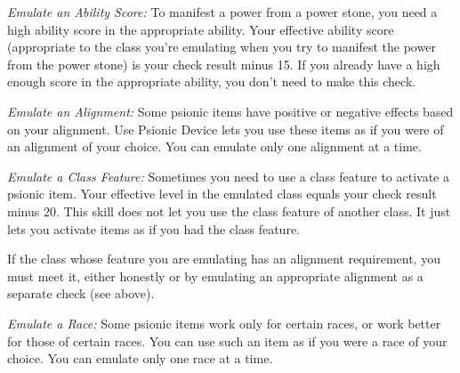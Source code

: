 
\textit{Emulate an Ability Score:} To manifest a power from a power stone, you need a high ability score in the appropriate ability. Your effective ability score (appropriate to the class you're emulating when you try to manifest the power from the power stone) is your check result minus 15. If you already have a high enough score in the appropriate ability, you don't need to make this check.

\textit{Emulate an Alignment:} Some psionic items have positive or negative effects based on your alignment. Use Psionic Device lets you use these items as if you were of an alignment of your choice. You can emulate only one alignment at a time.

\textit{Emulate a Class Feature:} Sometimes you need to use a class feature to activate a psionic item. Your effective level in the emulated class equals your check result minus 20. This skill does not let you use the class feature of another class. It just lets you activate items as if you had the class feature.

If the class whose feature you are emulating has an alignment requirement, you must meet it, either honestly or by emulating an appropriate alignment as a separate check (see above).

\textit{Emulate a Race:} Some psionic items work only for certain races, or work better for those of certain races. You can use such an item as if you were a race of your choice. You can emulate only one race at a time.



